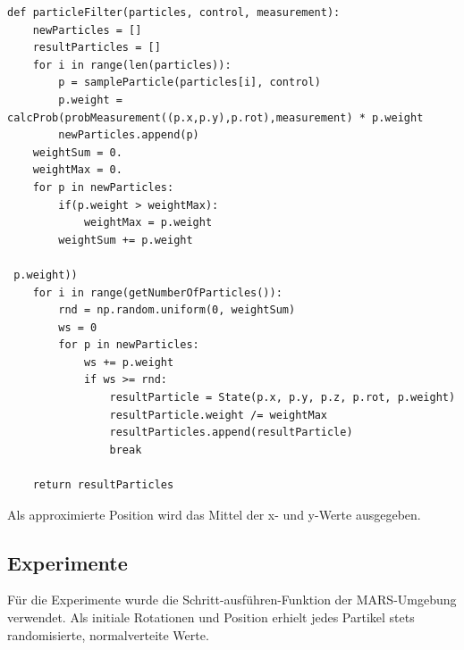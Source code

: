 \documentclass{../Vorlage/mat}
\begin{document}
\begin{lstlisting}
def particleFilter(particles, control, measurement):
    newParticles = []
    resultParticles = []
    for i in range(len(particles)):
        p = sampleParticle(particles[i], control)
        p.weight = calcProb(probMeasurement((p.x,p.y),p.rot),measurement) * p.weight
        newParticles.append(p)
    weightSum = 0.
    weightMax = 0.
    for p in newParticles:
        if(p.weight > weightMax):
            weightMax = p.weight
        weightSum += p.weight

 p.weight))
    for i in range(getNumberOfParticles()):
        rnd = np.random.uniform(0, weightSum)
        ws = 0
        for p in newParticles:
            ws += p.weight
            if ws >= rnd:
                resultParticle = State(p.x, p.y, p.z, p.rot, p.weight)
                resultParticle.weight /= weightMax
                resultParticles.append(resultParticle)
                break

    return resultParticles
\end{lstlisting}

Als approximierte Position wird das Mittel der x- und y-Werte ausgegeben.
\newpage
\subsection*{Experimente}
Für die Experimente wurde die Schritt-ausführen-Funktion der MARS-Umgebung verwendet. Als initiale Rotationen und Position erhielt jedes Partikel stets randomisierte, normalverteite Werte.
\end{document}
